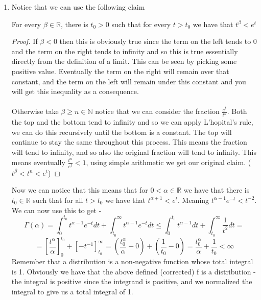 \documentclass[../main.tex]{subfiles}
\begin{document}
\begin{enumerate}


\item Notice that we can use the following claim


\begin{mdframed}


\begin{claim}
For every $\beta\in\mathbb{R}$, there is $t_0>0$ such that for every $t>t_0$ we have that $t^{\beta}<e^t$
\end{claim}
\begin{proof}
If $\beta<0$ then this is obviously true since the term on the left tends to 0 and the term on the right tends to infinity and so this is true essentially directly from the definition of a limit. This can be seen by picking some positive value. Eventually the term on the right will remain over that constant, and the term on the left will remain under this constant and you will get this inequality as a consequence. \\\\
Otherwise take $\beta\geq n\in\mathbb{N}$ notice that we can consider the fraction $\frac{e^t}{t^n}$. Both the top and the bottom tend to infinity and so we can apply L'hopital's rule, we can do this recursively until the bottom is a constant. The top will continue to stay the same throughout this process. This means the fraction will tend to infinity, and so also the original fraction will tend to infinity. This means eventually $\frac{t^n}{e^t}<1$, using simple arithmetic we get our original claim. ($t^{\beta}<t^n<e^t$)
\end{proof}
\end{mdframed}

Now we can notice that this means that for $0<\alpha\in\mathbb{R}$ we have that there is $t_0\in\mathbb{R}$ such that for all $t>t_0$ we have that $t^{\alpha+1}<e^t$. Meaning $t^{\alpha-1}e^{-t}<t^{-2}$. We can now use this to get - 
\[\Gamma(\alpha) = \int_0^{t_0} t^{\alpha-1}e^{-t} dt + \int_{t_0}^\infty t^{\alpha-1}e^{-t} dt \leq \int_0^{t_0} t^{\alpha-1}dt + \int_{t_0}^\infty \frac{1}{t^2} dt =\]
\[= \left[\frac{t^{\alpha}}{\alpha}\right]^{t_0}_0 +\left[-t^{-1}\right]^\infty_{t_0} = \left(\frac{t_0^\alpha}{\alpha} - 0\right) + \left(\frac{1}{t_0} - 0\right) = \frac{t^{\alpha}_0}{\alpha}+\frac{1}{t_0}<\infty \]
 Remember that a distribution is a non-negative function whose total integral is 1. Obviously we have that the above defined (corrected) f is a distribution - the integral is positive since the integrand is positive, and we normalized the integral to give us a total integral of 1.  \qedsymbol


\end{enumerate}
\end{document}

